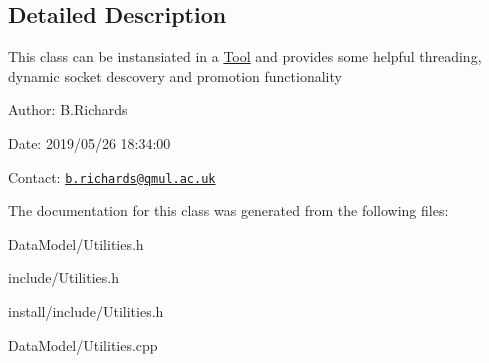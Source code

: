 \subsection{Detailed Description}
This class can be instansiated in a \hyperlink{classTool}{Tool} and provides some helpful threading, dynamic socket descovery and promotion functionality

\begin{DoxyParagraph}{Author\-:}
B.\-Richards 
\end{DoxyParagraph}
\begin{DoxyParagraph}{Date\-:}
2019/05/26 18\-:34\-:00 
\end{DoxyParagraph}
Contact\-: \href{mailto:b.richards@qmul.ac.uk}{\tt b.\-richards@qmul.\-ac.\-uk} 

The documentation for this class was generated from the following files\-:\begin{DoxyCompactItemize}
\item 
Data\-Model/Utilities.\-h\item 
include/Utilities.\-h\item 
install/include/Utilities.\-h\item 
Data\-Model/Utilities.\-cpp\end{DoxyCompactItemize}
